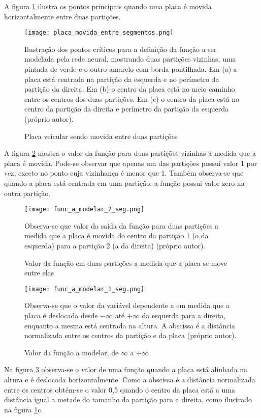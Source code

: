 A figura \ref{fig:placa_movida_entre_segmentos} ilustra os pontos principais
quando uma placa é movida horizontalmente entre duas partições.

\begin{figure}[!htb]
	\centering
	\texttt{[image: placa\_movida\_entre\_segmentos.png]}
	\caption{Placa veicular sendo movida entre duas partições}
	\label{fig:placa_movida_entre_segmentos}
	Ilustração dos pontos críticos para a definição da função a ser modelada
	pela rede neural, mostrando duas partições vizinhas, uma pintada de verde e
	o outro amarelo com borda pontilhada. Em (a) a placa está centrada na
	partição da esquerda e no perímetro da partição da direita.
	Em (b) o centro da placa está no meio caminho entre os centros dos duas
	partições. Em (c) o centro da placa está no centro da partição da direita e
	perímetro da partição da esquerda (próprio autor).
\end{figure}

A figura \ref{fig:func_a_modelar_2_seg} mostra o valor da função para
duas partições vizinhas à medida que a placa é movida. Pode-se observar que
apenas um das partições possui valor 1 por vez, exceto no ponto cuja vizinhança
é menor que 1. Também observa-se
que quando a placa está centrada em uma partição, a função possui valor zero
na outra partição.

\begin{figure}[!htb]
	\centering
	\texttt{[image: func\_a\_modelar\_2\_seg.png]}
	\caption{Valor da função em duas partições a medida que a placa se move
	entre elas}
	\label{fig:func_a_modelar_2_seg}
	Observa-se que valor da saída da função para duas partições a medida que a
	placa é movida do centro da partição 1 (o da esquerda) para a partição 2 (a
	da direita) (próprio autor).
\end{figure}

\begin{figure}[!htb]
	\centering
	\texttt{[image: func\_a\_modelar\_1\_seg.png]}
	\caption{Valor da função a modelar, de $\infty$ a $+\infty$}
	\label{fig:func_a_modelar_1_seg}
	Observa-se que o valor da variável dependente a em medida que a placa
	é deslocada desde $-\infty$ até $+\infty$ da esquerda para a direita,
	enquanto a mesma está centrada na altura. A abscissa é a distância
	normalizada entre os centros da partição e da placa (próprio autor).
\end{figure}

Na figura \ref{fig:func_a_modelar_1_seg} observa-se o valor de uma função
quando a placa está alinhada na altura e é deslocada horizontalmente. Como
a abscissa é a distância normalizada entre os centros obtém-se o valor 0,5
quando o centro da placa está a uma distância igual a metade do tamanho da
partição para a direita, como ilustrado na figura
\ref{fig:placa_movida_entre_segmentos}c.

